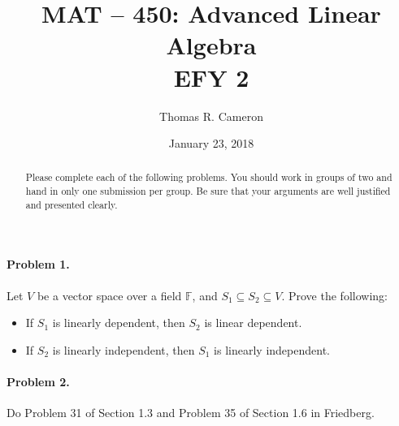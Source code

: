\documentclass{article}
\title{MAT -- 450: Advanced Linear Algebra\\
\large{EFY 2}}
\author{Thomas R. Cameron}
\date{January 23, 2018}
\begin{document}
\maketitle

\begin{abstract}
Please complete each of the following problems. You should work in groups of two and hand in only one submission per group. Be sure that your arguments are well justified and presented clearly. 
\end{abstract}

\paragraph*{Problem 1.}	Let $V$ be a vector space over a field $\mathbb{F}$, and $S_{1}\subseteq S_{2}\subseteq V$. Prove the following:
\begin{itemize}
\item If $S_{1}$ is linearly dependent, then $S_{2}$ is linear dependent.
\item If $S_{2}$ is linearly independent, then $S_{1}$ is linearly independent.
\end{itemize}

\paragraph*{Problem 2.}	Do Problem 31 of Section 1.3 and Problem 35 of Section 1.6 in Friedberg. 
\end{document}
